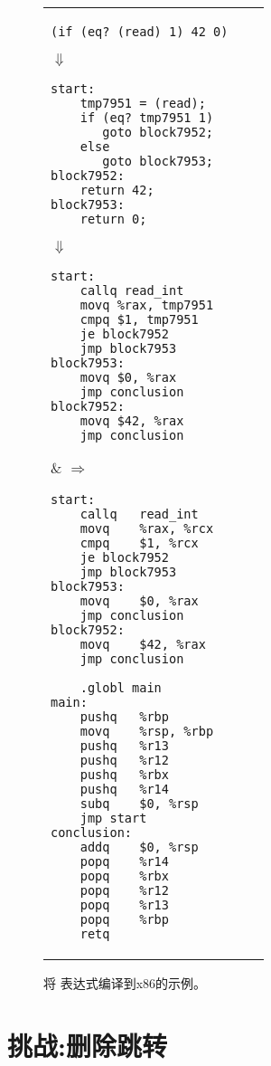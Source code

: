 \documentclass[11pt]{book}
\begin{document}
\begin{figure}[tbp]
\begin{tabular}{lll}
\begin{minipage}{0.4\textwidth}
\begin{lstlisting}
(if (eq? (read) 1) 42 0)
\end{lstlisting}
$\Downarrow$
\begin{lstlisting}
start:
    tmp7951 = (read);
    if (eq? tmp7951 1)
       goto block7952;
    else
       goto block7953;
block7952:
    return 42;
block7953:
    return 0;
\end{lstlisting}
$\Downarrow$
\begin{lstlisting}
start:
    callq read_int
    movq %rax, tmp7951
    cmpq $1, tmp7951
    je block7952
    jmp block7953
block7953:
    movq $0, %rax
    jmp conclusion
block7952:
    movq $42, %rax
    jmp conclusion
\end{lstlisting}
\end{minipage}
&
$\Rightarrow\qquad$
\begin{minipage}{0.4\textwidth}
\begin{lstlisting}
start:
	callq	read_int
	movq	%rax, %rcx
	cmpq	$1, %rcx
	je block7952
	jmp block7953
block7953:
	movq	$0, %rax
	jmp conclusion
block7952:
	movq	$42, %rax
	jmp conclusion

	.globl main
main:
	pushq	%rbp
	movq	%rsp, %rbp
	pushq	%r13
	pushq	%r12
	pushq	%rbx
	pushq	%r14
	subq	$0, %rsp
	jmp start
conclusion:
	addq	$0, %rsp
	popq	%r14
	popq	%rbx
	popq	%r12
	popq	%r13
	popq	%rbp
	retq
\end{lstlisting}
\end{minipage}
\end{tabular}
\caption{将  表达式编译到x86的示例。}
\label{fig:if-example-x86}
\end{figure}


\section{挑战:删除跳转}
\label{sec:opt-jumps}

\end{document}
